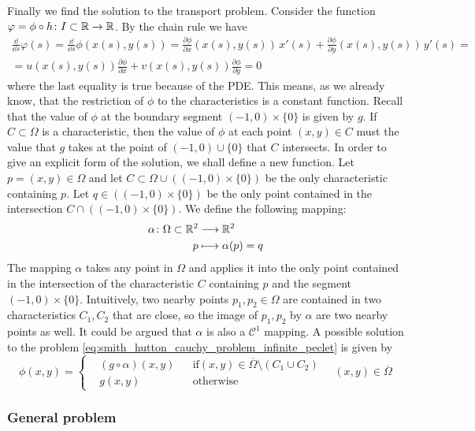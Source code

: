 Finally we find the solution to the transport problem. Consider the function
$\varphi = \phi \circ h \colon I \subset \mathbb{R} \to \mathbb{R}$. By the chain rule we
have
\begin{multline}
	\frac{\dd}{\dd{s}} \varphi(s) = 
	\frac{\dd}{\dd{s}} \phi(x(s), y(s)) = 
	\frac{\partial \phi}{\partial x} (x(s), y(s)) \, x'(s) + 
	\frac{\partial \phi}{\partial y} (x(s), y(s)) \, y'(s) = \\ =
	u(x(s),y(s)) \frac{\partial \phi}{\partial x} + 
	v(x(s),y(s)) \frac{\partial \phi}{\partial y} = 0
\end{multline}
where the last equality is true because of the PDE. This means, as we already
know, that the restriction of $\phi$ to the characteristics is a constant
function. Recall that the value of $\phi$ at the boundary segment $(-1,0) \times
\{ 0 \}$ is given by $g$. If $C \subset \Omega$ is a characteristic, then the
value of $\phi$ at each point $(x,y) \in C$ must the value that $g$ takes at the
point of $(-1,0) \cup \{ 0 \}$ that $C$ intersects. In order to give an explicit
form of the solution, we shall define a new function. Let $p = (x,y) \in \Omega$
and let $C \subset \Omega \cup ((-1,0) \times \{ 0 \})$ be the only
characteristic containing $p$. Let $q \in ((-1,0) \times \{ 0 \})$ be the only
point contained in the intersection $C \cap ((-1,0) \times \{ 0 \})$. We define
the following mapping:
\begin{equation}
	\begin{aligned}
		\alpha \colon \Omega \subset \mathbb{R}^2 &\longrightarrow \mathbb{R}^2 \\
		p &\longmapsto \alpha(p) = q
	\end{aligned}
\end{equation}
The mapping $\alpha$ takes any point in $\Omega$ and applies it into the only
point contained in the intersection of the characteristic $C$ containing $p$ and
the segment $(-1,0) \times \{ 0 \}$. Intuitively, two nearby points $p_1, p_2
\in \Omega$ are contained in two characteristics $C_1, C_2$ that are close, so
the image of $p_1, p_2$ by $\alpha$ are two nearby points as well. It could be
argued that $\alpha$ is also a $\mathcal{C}^1$ mapping. A possible solution to
the problem \eqref{eq:smith_hutton_cauchy_problem_infinite_peclet} is given by
\begin{equation}
	\phi(x,y) = 
	\left\{
	\begin{aligned}
		&(g \circ \alpha)(x,y) & &\text{if} (x,y) \in \overline{\Omega} \setminus (C_1 \cup C_2) \\
		&g(x,y) & &\text{otherwise}
	\end{aligned}
	\right.
	\quad (x,y) \in \overline{\Omega}
\end{equation}

\subsubsection{General problem}
